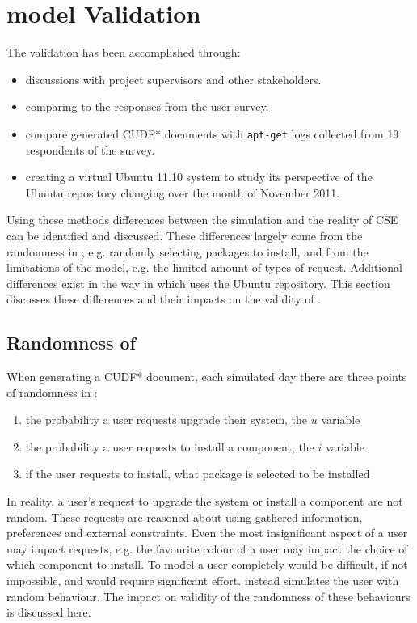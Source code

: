 \section{\usermodel model Validation}
\label{sim.modelvalidation}
The \usermodel validation has been accomplished through:
\begin{itemize}
  \item discussions with project supervisors and other stakeholders.
  \item comparing \usermodel to the responses from the user survey.
  \item compare generated CUDF* documents with \texttt{apt-get} logs collected from 19 respondents of the survey.
  \item creating a virtual Ubuntu 11.10 system to study its perspective of the Ubuntu repository changing over the month of November 2011.
\end{itemize}

Using these methods differences between the simulation and the reality of CSE can be identified and discussed.
These differences largely come from the randomness in \usermodel, e.g. randomly selecting packages to install,
and from the limitations of the model, e.g. the limited amount of types of request.
Additional differences exist in the way in which \usermodel uses the Ubuntu repository.
This section discusses these differences and their impacts on the validity of \usermodel.

\subsection{Randomness of \usermodel}
When generating a CUDF* document, each simulated day there are three points of randomness in \usermodel:
\begin{enumerate}
  \item the probability a user requests upgrade their system, the $u$ variable
  \item the probability a user requests to install a component, the $i$ variable
  \item if the user requests to install, what package is selected to be installed
\end{enumerate}
In reality, a user's request to upgrade the system or install a component are not random.
These requests are reasoned about using gathered information, preferences and external constraints.
Even the most insignificant aspect of a user may impact requests, e.g. the favourite colour of a user may impact the choice of which component to install.
To model a user completely would be difficult, if not impossible, and would require significant effort.
\usermodel instead simulates the user with random behaviour.
The impact on validity of the randomness of these behaviours is discussed here.


